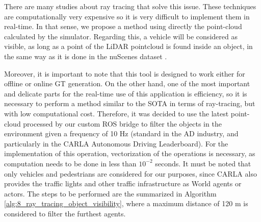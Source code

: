 There are many studies about ray tracing that solve this issue. These techniques \cite{raytracing1, raytracing2} are computationally very expensive so it is very difficult to implement them in real-time. In that sense, we propose a method using directly the point-cloud calculated by the simulator. Regarding this, a vehicle will be considered as visible, as long as a point of the \ac{LiDAR} pointcloud is found inside an object, in the same way as it is done in the nuScenes dataset \cite{caesar2020nuscenes}. 

Moreover, it is important to note that this tool is designed to work either for offline or online \ac{GT} generation. On the other hand, one of the most important and delicate parts for the real-time use of this application is efficiency, so it is necessary to perform a method similar to the \ac{SOTA} in terms of ray-tracing, but with low computational cost. Therefore, it was decided to use the latest point-cloud processed by our custom \ac{ROS} bridge to filter the objects in the environment given a frequency of 10 Hz (standard in the \ac{AD} industry, and particularly in the \ac{CARLA} Autonomous Driving Leaderboard). For the implementation of this operation, vectorization of the operations is necessary, as computation needs to be done in less than $10^{-2}$ seconds. It must be noted that only vehicles and pedestrians are considered for our purposes, since \ac{CARLA} also provides the traffic lights and other traffic infrastructure as World agents or actors. The steps to be performed are the summarized in Algorithm \ref{alg:8_ray_tracing_object_visibility}, where a maximum distance of 120 m is considered to filter the furthest agents.

